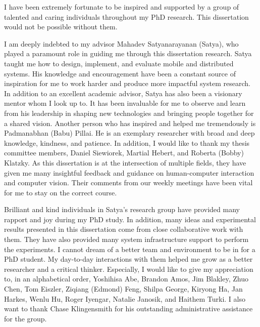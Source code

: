 \begin{acknowledgments}
    I have been extremely fortunate to be inspired and supported by a group of
    talented and caring individuals throughout my PhD research. This
    dissertation would not be possible without them.

    I am deeply indebted to my advisor Mahadev Satyanarayanan (Satya), who
    played a paramount role in guiding me through this dissertation research. Satya
    taught me how to design, implement, and evaluate mobile and distributed systems.
    His knowledge and encouragement have been a constant source of inspiration for
    me to work harder and produce more impactful system research. In addition to an
    excellent academic advisor, Satya has also been a visionary mentor whom I look
    up to. It has been invaluable for me to observe and learn from his leadership in
    shaping new technologies and bringing people together for a shared vision.
    Another person who has inspired and helped me tremendously is Padmanabhan (Babu)
    Pillai. He is an exemplary researcher with broad and deep knowledge, kindness,
    and patience. In addition, I would like to thank my thesis committee members,
    Daniel Siewiorek, Martial Hebert, and Roberta (Bobby) Klatzky. As this
    dissertation is at the intersection of multiple fields, they have given me many
    insightful feedback and guidance on human-computer interaction and computer
    vision. Their comments from our weekly meetings have been vital for me to stay
    on the correct course.

    Brilliant and kind individuals in Satya's research group have
    provided many rapport and joy during my PhD study. In addition, many ideas
    and experimental results presented in this dissertation come from close
    collaborative work with them. They have also provided many system
    infrastructure support to perform the experiments. I cannot dream of a
    better team and environment to be in for a PhD student. My day-to-day
    interactions with them helped me grow as a better researcher and a critical
    thinker. Especially, I would like to give my appreciation to, in an
    alphabetical order, Yoshihisa Abe, Brandon Amos, Jim Blakley, Zhuo Chen, Tom
    Eiszler, Ziqiang (Edmond) Feng, Shilpa George, Kiryong Ha, Jan Harkes, Wenlu
    Hu, Roger Iyengar, Natalie Janosik, and Haithem Turki. I also want to thank
    Chase Klingensmith for his outstanding administrative assistance for the
    group.


\end{acknowledgments}
